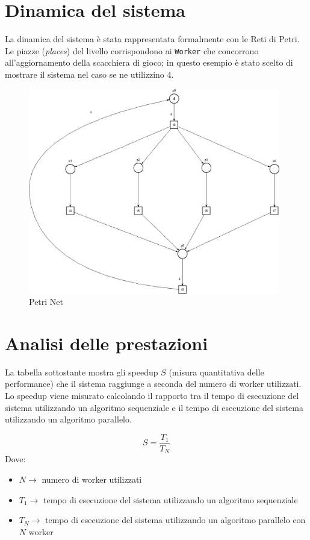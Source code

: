 ﻿\documentclass[a4paper]{article}
\begin{document}
\section{Dinamica del sistema}\label{dinamica-del-sistema}
La dinamica del sistema è stata rappresentata formalmente con le Reti di Petri. Le piazze (\textit{places}) del livello corrispondono ai \texttt{Worker} che concorrono all'aggiornamento della scacchiera di gioco; in questo esempio è stato scelto di mostrare il sistema nel caso se ne utilizzino 4.
\begin{figure}[H]
    \centering
    \includegraphics[width=110mm]{res/reti_di_petri_assigment1.png}
    \caption{Petri Net}
    \label{fig:petrinets}
\end{figure}

\section{Analisi delle prestazioni}\label{analisi-delle-prestazioni}
La tabella sottostante mostra gli speedup $S$ (misura quantitativa delle performance) che il sistema raggiunge a seconda del numero di worker utilizzati.\\
Lo speedup viene misurato calcolando il rapporto tra il tempo di esecuzione del sistema utilizzando un algoritmo sequenziale e il tempo di esecuzione del sistema utilizzando un algoritmo parallelo.

\begin{equation}
 S = \dfrac{T_1}{T_N}
\end{equation}
Dove:
\begin{itemize}
    \item $ N  \rightarrow$ numero di worker utilizzati
    \item $ T_1 \rightarrow$ tempo di esecuzione del sistema utilizzando un algoritmo sequenziale
    \item $ T_N \rightarrow$ tempo di esecuzione del sistema utilizzando un algoritmo parallelo con $N$ worker
\end{itemize}
\end{document}
